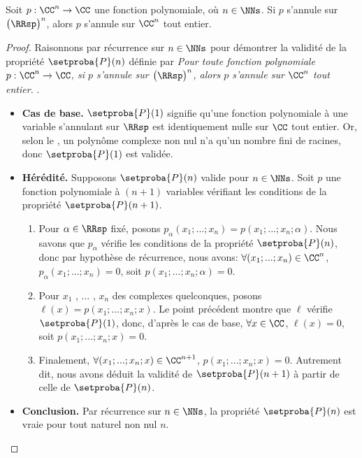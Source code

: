 \begin{fact} \label{poly-nullity-pos}
	Soit $p: \CC^n \rightarrow \CC$ une fonction polynomiale, où $n \in \NNs$.
	Si $p$ s'annule sur $\big( \RRsp \big)^n$, alors $p$ s'annule sur $\CC^n$ tout entier. 
\end{fact}


\begin{proof}
	Raisonnons par récurrence sur $n \in \NNs$ pour démontrer la validité de la propriété $\setproba{P}(n)$ définie par
	\emph{\og 
		Pour toute fonction polynomiale $p: \CC^n \rightarrow \CC$,
		si $p$ s'annule sur $\big( \RRsp \big)^n$,
		alors $p$ s'annule sur $\CC^n$ tout entier. 
	\fg}\kern2pt.
	\begin{itemize}[label=\small\textbullet]
		\item \textbf{Cas de base.}
		$\setproba{P}(1)$ signifie qu'une fonction polynomiale à une variable s'annulant sur $\RRsp$ est identiquement nulle sur $\CC$ tout entier.
		Or, selon le , un polynôme complexe non nul n'a qu'un nombre fini de racines, donc $\setproba{P}(1)$ est validée.


		\item \textbf{Hérédité.}
		Supposons $\setproba{P}(n)$ valide pour $n \in \NNs$.
		Soit $p$ une fonction polynomiale à $(n + 1)$ variables vérifiant les conditions de la propriété $\setproba{P}(n + 1)$.
		\begin{enumerate}
		    \item Pour $\alpha \in \RRsp$ fixé,
		    posons $p_\alpha(x_1 ; ... ; x_n) = p(x_1 ; ... ; x_n ; \alpha)$.
		    Nous savons que $p_\alpha$ vérifie les conditions de la propriété $\setproba{P}(n)$,
		    donc par hypothèse de récurrence, nous avons:
		    $\forall (x_1 ; ... ; x_n) \in \CC^n$,
		    $p_\alpha(x_1 ; ... ; x_n) = 0$,
		    soit $p(x_1 ; ... ; x_n ; \alpha) = 0$.


		    \item Pour $x_1$ , ... , $x_n$ des complexes quelconques,
		    posons $\ell(x) = p(x_1 ; ... ; x_n ; x)$.
		    Le point précédent montre que $\ell$ vérifie $\setproba{P}(1)$, donc, d'après le cas de base,
		    $\forall x \in \CC$,
		    $\ell(x) = 0$,
		    soit $p(x_1 ; ... ; x_n ; x) = 0$.


		    \item Finalement,
		    $\forall (x_1 ; ... ; x_n ; x) \in \CC^{n+1}$,
		    $p(x_1 ; ... ; x_n ; x) = 0$.
		    Autrement dit, nous avons déduit la validité de $\setproba{P}(n+1)$ à partir de celle de $\setproba{P}(n)$.
		\end{enumerate}
		
		
		\item \textbf{Conclusion.}
		Par récurrence sur $n \in \NNs$, la propriété $\setproba{P}(n)$ est vraie pour tout naturel non nul $n$.
	\end{itemize}

	\null\vspace{-6ex}
\end{proof}


